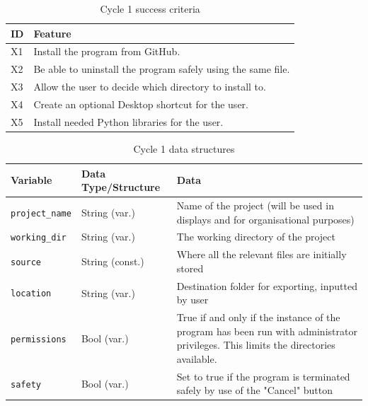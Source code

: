 \documentclass[11pt]{article}
\begin{document}
        \newpage
        \begin{table}[!h]
            \centering
            \begin{tabular}{@{}ll@{}} \toprule
                \textbf{ID} & \textbf{Feature} \\ \midrule
                X1 & Install the program from GitHub. \\ 
                X2 & Be able to uninstall the program safely using the same file. \\ 
                X3 & Allow the user to decide which directory to install to. \\ 
                X4 & Create an optional Desktop shortcut for the user. \\ 
                X5 & Install needed Python libraries for the user. \\
                \bottomrule
            \end{tabular}
            \caption{Cycle 1 success criteria}
            \label{tbl:succ_crit_c1}
        \end{table}


        \newpage
        \begin{table}[!h]
            \centering
            \begin{tabular}{@{}llp{}@{}} \toprule
                \textbf{Variable} & \textbf{Data Type/Structure} & \textbf{Data} \\ \midrule
                \verb|project_name| & String (var.) & Name of the project (will be used in displays and for organisational purposes) \\ \medskip
                \verb|working_dir| & String (var.) & The working directory of the project \\ \medskip
                \verb|source| & String (const.) & Where all the relevant files are initially stored \\ \medskip
                \verb|location| & String (var.) & Destination folder for exporting, inputted by user \\ \medskip
                \verb|permissions| & Bool (var.) & True if and only if the instance of the program has been run with administrator privileges. This limits the directories available. \\ \medskip
                \verb|safety| & Bool (var.) & Set to true if the program is terminated safely by use of the "Cancel" button \\
                \bottomrule
            \end{tabular}
            \caption{Cycle 1 data structures}
            \label{tbl:data_structs_c1}
        \end{table}
\end{document}
